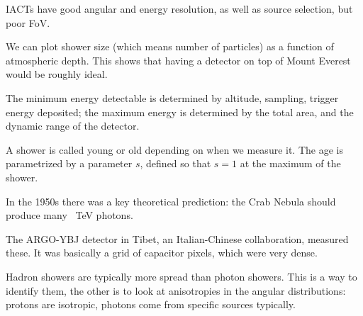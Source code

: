 \documentclass[main.tex]{subfiles}
\begin{document}
IACTs have good angular and energy resolution, as well as source selection, 
but poor FoV. 

We can plot shower size (which means number of particles) as a function of atmospheric depth. 
This shows that having a detector on top of Mount Everest would be roughly ideal. 

The minimum energy detectable is determined by altitude, sampling, trigger energy deposited;
the maximum energy is determined by the total area, and the dynamic range of the detector. 

A shower is called young or old depending on when we measure it.
The age is parametrized by a parameter \(s\), defined so that \(s=1\) at the maximum of the shower.

In the 1950s there was a key theoretical prediction: the Crab Nebula should 
produce many \SI{}{TeV} photons. 

The ARGO-YBJ detector in Tibet, an Italian-Chinese collaboration, measured these. 
It was basically a grid of capacitor pixels, which were very dense. 

Hadron showers are typically more spread than photon showers. 
This is a way to identify them, the other is to look at 
anisotropies in the angular distributions: protons are isotropic, photons 
come from specific sources typically. 
\end{document}
